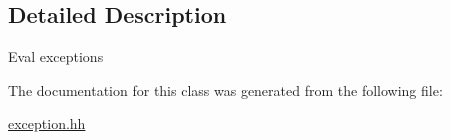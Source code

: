 \subsection{Detailed Description}
Eval exceptions 

The documentation for this class was generated from the following file\-:\begin{DoxyCompactItemize}
\item 
\hyperlink{exception_8hh}{exception.\-hh}\end{DoxyCompactItemize}
